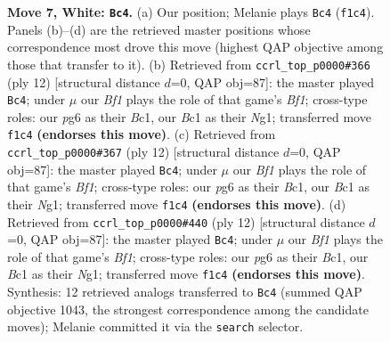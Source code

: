 \documentclass[11pt]{article}
\begin{document}
\begin{figure}[p]
\caption{\textbf{Move 7, White: \texttt{Bc4}.} (a) Our position; Melanie plays \texttt{Bc4} (\texttt{f1c4}). Panels (b)--(d) are the retrieved master positions whose correspondence most drove this move (highest QAP objective among those that transfer to it). (b) Retrieved from \texttt{ccrl\_top\_p0000\#366} (ply 12) [structural distance $d$=0, QAP obj=87]: the master played \texttt{Bc4}; under $\mu$ our \emph{Bf1} plays the role of that game's \emph{Bf1}; cross-type roles: our \emph{p}g6 as their \emph{B}c1, our \emph{B}c1 as their \emph{N}g1; transferred move \texttt{f1c4} \textbf{(endorses this move)}. (c) Retrieved from \texttt{ccrl\_top\_p0000\#367} (ply 12) [structural distance $d$=0, QAP obj=87]: the master played \texttt{Bc4}; under $\mu$ our \emph{Bf1} plays the role of that game's \emph{Bf1}; cross-type roles: our \emph{p}g6 as their \emph{B}c1, our \emph{B}c1 as their \emph{N}g1; transferred move \texttt{f1c4} \textbf{(endorses this move)}. (d) Retrieved from \texttt{ccrl\_top\_p0000\#440} (ply 12) [structural distance $d$=0, QAP obj=87]: the master played \texttt{Bc4}; under $\mu$ our \emph{Bf1} plays the role of that game's \emph{Bf1}; cross-type roles: our \emph{p}g6 as their \emph{B}c1, our \emph{B}c1 as their \emph{N}g1; transferred move \texttt{f1c4} \textbf{(endorses this move)}. Synthesis: 12 retrieved analogs transferred to \texttt{Bc4} (summed QAP objective 1043, the strongest correspondence among the candidate moves); Melanie committed it via the \texttt{search} selector.}
\label{fig:thought-m12}
\end{figure}

\clearpage
\end{document}
